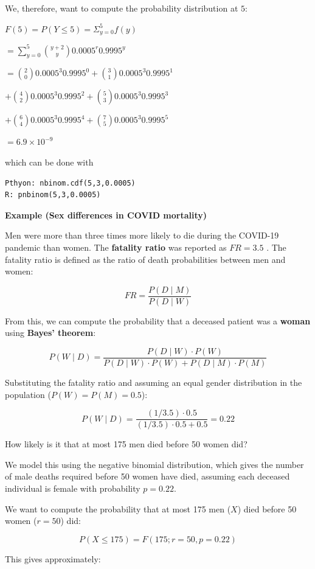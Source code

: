 \documentclass[
]{book}
\begin{document}
We, therefore, want to compute the probability distribution at \(5\):

\(F(5)=P(Y\leq 5)=\Sigma_{y=0}^5 f(y)\)

\(=\sum_{y=0}^5\binom {y+2} y 0.0005^r0.9995^y\)

\(=\binom {2} 0 0.0005^3 0.9995^0 +\binom {3} 1 0.0005^3 0.9995^1\)

\(+\binom {4} 2 0.0005^3 0.9995^2 +\binom {5} 3 0.0005^3 0.9995^3\)

\(+\binom {6} 4 0.0005^3 0.9995^4 +\binom {7} 5 0.0005^3 0.9995^5\)

\(= 6.9\times 10^{-9}\)

which can be done with

\begin{verbatim}
Pthyon: nbinom.cdf(5,3,0.0005)
R: pnbinom(5,3,0.0005)
\end{verbatim}

\textbf{Example (Sex differences in COVID mortality)}

Men were more than three times more likely to die during the COVID-19 pandemic than women. The \textbf{fatality ratio} was reported as \(FR = 3.5\) \citep{DehingiaRaj2021}. The fatality ratio is defined as the ratio of death probabilities between men and women:

\[
FR = \frac{P(D \mid M)}{P(D \mid W)}
\]

From this, we can compute the probability that a deceased patient was a \textbf{woman} using \textbf{Bayes' theorem}:

\[
P(W \mid D) = \frac{P(D \mid W) \cdot P(W)}{P(D \mid W) \cdot P(W) + P(D \mid M) \cdot P(M)}
\]

Substituting the fatality ratio and assuming an equal gender distribution in the population (\(P(W) = P(M) = 0.5\)):

\[
P(W \mid D) = \frac{(1/3.5) \cdot 0.5}{(1/3.5) \cdot 0.5 + 0.5} = 0.22
\]

How likely is it that at most 175 men died before 50 women did?

We model this using the negative binomial distribution, which gives the number of male deaths required before 50 women have died, assuming each deceased individual is female with probability \(p = 0.22\).

We want to compute the probability that at most 175 men (\(X\)) died before 50 women (\(r = 50\)) did:

\[
P(X \leq 175) = F(175; r = 50, p = 0.22)
\]

This gives approximately:
\end{document}
